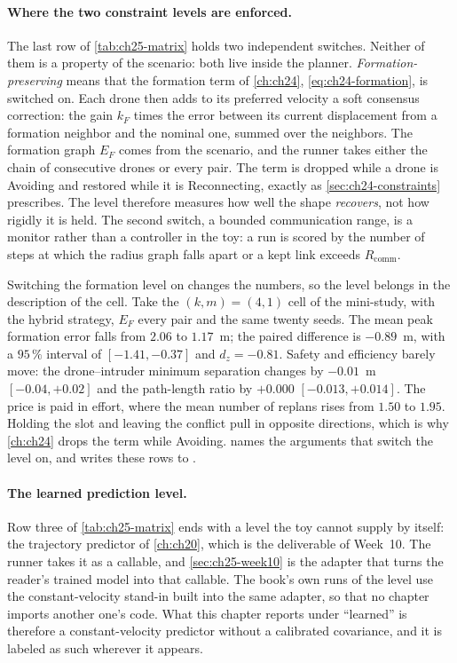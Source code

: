 \paragraph{Where the two constraint levels are enforced.}
The last row of \cref{tab:ch25-matrix} holds two independent switches.
Neither of them is a property of the scenario: both live inside the planner.
\emph{Formation-preserving} means that the formation term of \cref{ch:ch24},
\cref{eq:ch24-formation}, is switched on. Each drone then adds to its
preferred velocity a soft consensus correction: the gain $k_F$ times the
error between its current displacement from a formation neighbor and the
nominal one, summed over the neighbors. The formation graph $E_F$ comes
from the scenario, and the runner takes either the chain of consecutive
drones or every pair. The term is dropped while a drone is Avoiding and
restored while it is Reconnecting, exactly as \cref{sec:ch24-constraints}
prescribes. The level therefore measures how well the shape
\emph{recovers}, not how rigidly it is held. The second switch, a bounded
communication range, is a monitor rather than a controller in the toy: a run
is scored by the number of steps at which the radius graph falls apart or a
kept link exceeds $R_{\mathrm{comm}}$.

Switching the formation level on changes the numbers, so the level belongs
in the description of the cell. Take the $(k, m) = (4, 1)$ cell of the
mini-study, with the hybrid strategy, $E_F$ every pair and the same twenty
seeds. The mean peak formation error falls from $2.06$ to $1.17$~m; the
paired difference is $-0.89$~m, with a $95\,\%$ interval of $[-1.41, -0.37]$
and $d_z = -0.81$. Safety and efficiency barely move: the drone--intruder
minimum separation changes by $-0.01$~m $[-0.04, +0.02]$ and the
path-length ratio by $+0.000$ $[-0.013, +0.014]$. The price is paid in
effort, where the mean number of replans rises from $1.50$ to $1.95$.
Holding the slot and leaving the conflict pull in opposite directions, which
is why \cref{ch:ch24} drops the term while Avoiding.
 names the arguments that switch the level on,
and  writes these rows to
.

\paragraph{The learned prediction level.}
Row three of \cref{tab:ch25-matrix} ends with a level the toy cannot supply
by itself: the trajectory predictor of \cref{ch:ch20}, which is the
deliverable of Week~10. The runner takes it as a callable, and
\cref{sec:ch25-week10} is the adapter that turns the reader's trained model
into that callable. The book's own runs of the level use the
constant-velocity stand-in built into the same adapter, so that no chapter
imports another one's code. What this chapter reports under ``learned'' is
therefore a constant-velocity predictor without a calibrated covariance, and
it is labeled as such wherever it appears.


